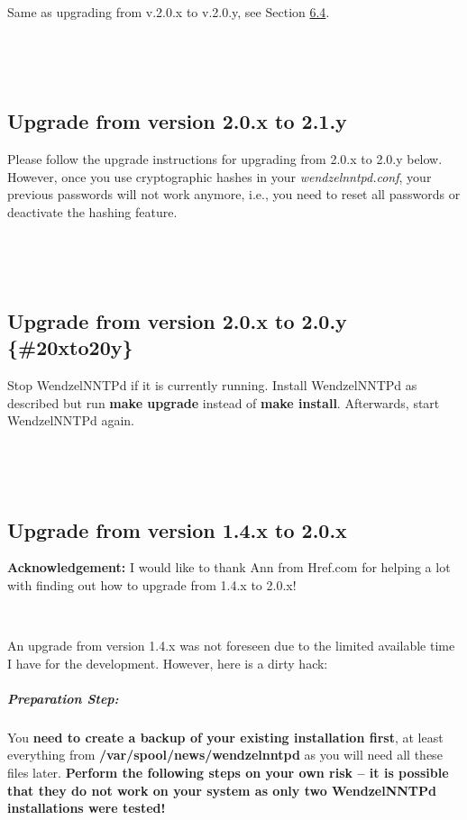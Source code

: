 \documentclass[12pt,fleqn,leqno]{scrbook}
\begin{document}
Same as upgrading from v.2.0.x to v.2.0.y, see Section
\protect\hyperlink{20xto20y}{6.4}.

~

~

\hypertarget{upgrade-from-version-2.0.x-to-2.1.y}{%
\subsection{Upgrade from version 2.0.x to
2.1.y}\label{upgrade-from-version-2.0.x-to-2.1.y}}

Please follow the upgrade instructions for upgrading from 2.0.x to 2.0.y
below. However, once you use cryptographic hashes in your
\emph{wendzelnntpd.conf}, your previous passwords will not work anymore,
i.e., you need to reset all passwords or deactivate the hashing feature.

~

~

\hypertarget{upgrade-from-version-2.0.x-to-2.0.y-20xto20y}{%
\subsection{Upgrade from version 2.0.x to 2.0.y
\{\#20xto20y\}}\label{upgrade-from-version-2.0.x-to-2.0.y-20xto20y}}

Stop WendzelNNTPd if it is currently running. Install WendzelNNTPd as
described but run \textbf{make upgrade} instead of \textbf{make
install}. Afterwards, start WendzelNNTPd again.

~

~

\hypertarget{upgrade-from-version-1.4.x-to-2.0.x}{%
\subsection{Upgrade from version 1.4.x to
2.0.x}\label{upgrade-from-version-1.4.x-to-2.0.x}}

\textbf{Acknowledgement:} I would like to thank Ann from Href.com for
helping a lot with finding out how to upgrade from 1.4.x to 2.0.x!

~

An upgrade from version 1.4.x was not foreseen due to the limited
available time I have for the development. However, here is a dirty
hack:

\hypertarget{preparation-step}{%
\subparagraph*{Preparation Step:}\label{preparation-step}}

You \textbf{need to create a backup of your existing installation
first}, at least everything from \textbf{/var/spool/news/wendzelnntpd}
as you will need all these files later. \textbf{Perform the following
steps on your own risk -- it is possible that they do not work on your
system as only two WendzelNNTPd installations were tested!}
\end{document}
